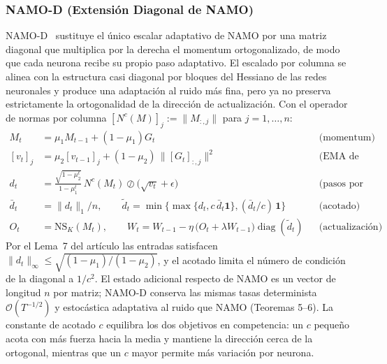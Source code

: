\subsubsection{NAMO-D (Extensión Diagonal de NAMO)}
NAMO-D~\citep{zhang_namo_2026} sustituye el único escalar adaptativo de NAMO por una
matriz diagonal que multiplica por la derecha el momentum ortogonalizado, de modo que
cada neurona recibe su propio paso adaptativo. El escalado por columna se alinea con la
estructura casi diagonal por bloques del Hessiano de las redes neuronales y produce una
adaptación al ruido más fina, pero ya no preserva estrictamente la ortogonalidad de la
dirección de actualización. Con el operador de normas por columna
$[N^c(M)]_j := \lVert M_{:,j}\rVert$ para $j=1,\dots,n$:
\begin{align}
M_t &= \mu_1 M_{t-1} + (1-\mu_1) G_t && \text{(momentum)} \\
[v_t]_j &= \mu_2 [v_{t-1}]_j + (1-\mu_2)\,\lVert [G_t]_{:,j}\rVert^2 && \text{(EMA de normas por columna)} \\
d_t &= \frac{\sqrt{1-\mu_2^t}}{1-\mu_1^t}\,N^c(M_t) \oslash \bigl(\sqrt{v_t}+\epsilon\bigr) && \text{(pasos por columna)} \\
\bar d_t &= \lVert d_t\rVert_1/n, \qquad
\tilde d_t = \min\bigl\{\max\{d_t, c\,\bar d_t \mathbf 1\}, (\bar d_t/c)\,\mathbf 1\bigr\} && \text{(acotado)} \\
O_t &= \mathrm{NS}_K(M_t), \qquad
W_t = W_{t-1} - \eta\,\bigl(O_t + \lambda W_{t-1}\bigr)\operatorname{diag}(\tilde d_t) && \text{(actualización)}
\end{align}
Por el Lema~7 del artículo las entradas satisfacen
$\lVert d_t\rVert_\infty \le \sqrt{(1-\mu_1)/(1-\mu_2)}$, y el acotado limita el número
de condición de la diagonal a $1/c^2$. El estado adicional respecto de NAMO es un
vector de longitud $n$ por matriz; NAMO-D conserva las mismas tasas determinista
$\mathcal{O}(T^{-1/2})$ y estocástica adaptativa al ruido que NAMO (Teoremas 5--6). La
constante de acotado $c$ equilibra los dos objetivos en competencia: un $c$ pequeño
acota con más fuerza hacia la media y mantiene la dirección cerca de la ortogonal,
mientras que un $c$ mayor permite más variación por neurona.

